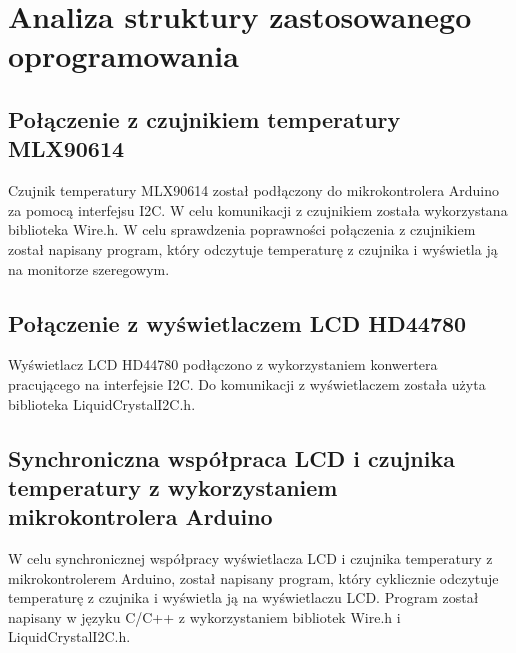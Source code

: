 \chapter{Analiza struktury zastosowanego oprogramowania}
\section{Połączenie z czujnikiem temperatury MLX90614}

Czujnik temperatury MLX90614 został podłączony do mikrokontrolera Arduino za pomocą interfejsu I2C. W celu komunikacji z czujnikiem została wykorzystana biblioteka Wire.h. W celu sprawdzenia poprawności połączenia z czujnikiem został napisany program, który odczytuje temperaturę z czujnika i wyświetla ją na monitorze szeregowym.

\section{Połączenie z wyświetlaczem LCD HD44780}

Wyświetlacz LCD HD44780 podłączono z wykorzystaniem konwertera pracującego na interfejsie I2C. Do komunikacji z wyświetlaczem została użyta biblioteka LiquidCrystalI2C.h.

\section{Synchroniczna współpraca LCD i czujnika temperatury z wykorzystaniem mikrokontrolera Arduino}

W celu synchronicznej współpracy wyświetlacza LCD i czujnika temperatury z mikrokontrolerem Arduino, został napisany program, który cyklicznie odczytuje temperaturę z czujnika i wyświetla ją na wyświetlaczu LCD. Program został napisany w języku C/C++ z wykorzystaniem bibliotek Wire.h i LiquidCrystalI2C.h.